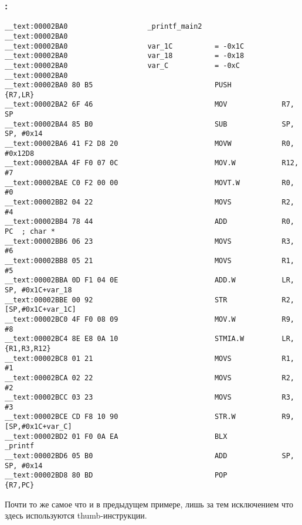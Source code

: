\subsubsection{\OptimizingXcode: \ThumbMode}

\begin{lstlisting}
__text:00002BA0                   _printf_main2
__text:00002BA0
__text:00002BA0                   var_1C          = -0x1C
__text:00002BA0                   var_18          = -0x18
__text:00002BA0                   var_C           = -0xC
__text:00002BA0
__text:00002BA0 80 B5                             PUSH            {R7,LR}
__text:00002BA2 6F 46                             MOV             R7, SP
__text:00002BA4 85 B0                             SUB             SP, SP, #0x14
__text:00002BA6 41 F2 D8 20                       MOVW            R0, #0x12D8
__text:00002BAA 4F F0 07 0C                       MOV.W           R12, #7
__text:00002BAE C0 F2 00 00                       MOVT.W          R0, #0
__text:00002BB2 04 22                             MOVS            R2, #4
__text:00002BB4 78 44                             ADD             R0, PC  ; char *
__text:00002BB6 06 23                             MOVS            R3, #6
__text:00002BB8 05 21                             MOVS            R1, #5
__text:00002BBA 0D F1 04 0E                       ADD.W           LR, SP, #0x1C+var_18
__text:00002BBE 00 92                             STR             R2, [SP,#0x1C+var_1C]
__text:00002BC0 4F F0 08 09                       MOV.W           R9, #8
__text:00002BC4 8E E8 0A 10                       STMIA.W         LR, {R1,R3,R12}
__text:00002BC8 01 21                             MOVS            R1, #1
__text:00002BCA 02 22                             MOVS            R2, #2
__text:00002BCC 03 23                             MOVS            R3, #3
__text:00002BCE CD F8 10 90                       STR.W           R9, [SP,#0x1C+var_C]
__text:00002BD2 01 F0 0A EA                       BLX             _printf
__text:00002BD6 05 B0                             ADD             SP, SP, #0x14
__text:00002BD8 80 BD                             POP             {R7,PC}
\end{lstlisting}

Почти то же самое что и в  предыдущем примере, лишь за тем исключением что здесь используются thumb-инструкции.

